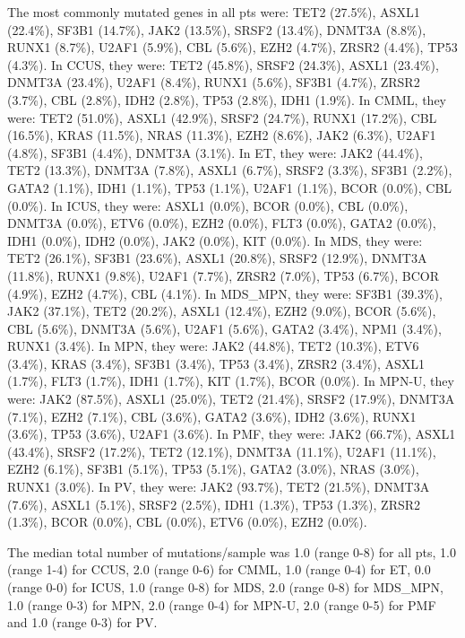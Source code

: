 The most commonly mutated genes in all pts were: TET2 (27.5\%), ASXL1 (22.4\%), SF3B1 (14.7\%), JAK2 (13.5\%), SRSF2 (13.4\%), DNMT3A (8.8\%), RUNX1 (8.7\%), U2AF1 (5.9\%), CBL (5.6\%), EZH2 (4.7\%), ZRSR2 (4.4\%), TP53 (4.3\%). In CCUS, they were: TET2 (45.8\%), SRSF2 (24.3\%), ASXL1 (23.4\%), DNMT3A (23.4\%), U2AF1 (8.4\%), RUNX1 (5.6\%), SF3B1 (4.7\%), ZRSR2 (3.7\%), CBL (2.8\%), IDH2 (2.8\%), TP53 (2.8\%), IDH1 (1.9\%). In CMML, they were: TET2 (51.0\%), ASXL1 (42.9\%), SRSF2 (24.7\%), RUNX1 (17.2\%), CBL (16.5\%), KRAS (11.5\%), NRAS (11.3\%), EZH2 (8.6\%), JAK2 (6.3\%), U2AF1 (4.8\%), SF3B1 (4.4\%), DNMT3A (3.1\%). In ET, they were: JAK2 (44.4\%), TET2 (13.3\%), DNMT3A (7.8\%), ASXL1 (6.7\%), SRSF2 (3.3\%), SF3B1 (2.2\%), GATA2 (1.1\%), IDH1 (1.1\%), TP53 (1.1\%), U2AF1 (1.1\%), BCOR (0.0\%), CBL (0.0\%). In ICUS, they were: ASXL1 (0.0\%), BCOR (0.0\%), CBL (0.0\%), DNMT3A (0.0\%), ETV6 (0.0\%), EZH2 (0.0\%), FLT3 (0.0\%), GATA2 (0.0\%), IDH1 (0.0\%), IDH2 (0.0\%), JAK2 (0.0\%), KIT (0.0\%). In MDS, they were: TET2 (26.1\%), SF3B1 (23.6\%), ASXL1 (20.8\%), SRSF2 (12.9\%), DNMT3A (11.8\%), RUNX1 (9.8\%), U2AF1 (7.7\%), ZRSR2 (7.0\%), TP53 (6.7\%), BCOR (4.9\%), EZH2 (4.7\%), CBL (4.1\%). In MDS_MPN, they were: SF3B1 (39.3\%), JAK2 (37.1\%), TET2 (20.2\%), ASXL1 (12.4\%), EZH2 (9.0\%), BCOR (5.6\%), CBL (5.6\%), DNMT3A (5.6\%), U2AF1 (5.6\%), GATA2 (3.4\%), NPM1 (3.4\%), RUNX1 (3.4\%). In MPN, they were: JAK2 (44.8\%), TET2 (10.3\%), ETV6 (3.4\%), KRAS (3.4\%), SF3B1 (3.4\%), TP53 (3.4\%), ZRSR2 (3.4\%), ASXL1 (1.7\%), FLT3 (1.7\%), IDH1 (1.7\%), KIT (1.7\%), BCOR (0.0\%). In MPN-U, they were: JAK2 (87.5\%), ASXL1 (25.0\%), TET2 (21.4\%), SRSF2 (17.9\%), DNMT3A (7.1\%), EZH2 (7.1\%), CBL (3.6\%), GATA2 (3.6\%), IDH2 (3.6\%), RUNX1 (3.6\%), TP53 (3.6\%), U2AF1 (3.6\%). In PMF, they were: JAK2 (66.7\%), ASXL1 (43.4\%), SRSF2 (17.2\%), TET2 (12.1\%), DNMT3A (11.1\%), U2AF1 (11.1\%), EZH2 (6.1\%), SF3B1 (5.1\%), TP53 (5.1\%), GATA2 (3.0\%), NRAS (3.0\%), RUNX1 (3.0\%). In PV, they were: JAK2 (93.7\%), TET2 (21.5\%), DNMT3A (7.6\%), ASXL1 (5.1\%), SRSF2 (2.5\%), IDH1 (1.3\%), TP53 (1.3\%), ZRSR2 (1.3\%), BCOR (0.0\%), CBL (0.0\%), ETV6 (0.0\%), EZH2 (0.0\%).

The median total number of mutations/sample was 1.0 (range 0-8) for all pts, 1.0 (range 1-4) for CCUS, 2.0 (range 0-6) for CMML, 1.0 (range 0-4) for ET, 0.0 (range 0-0) for ICUS, 1.0 (range 0-8) for MDS, 2.0 (range 0-8) for MDS_MPN, 1.0 (range 0-3) for MPN, 2.0 (range 0-4) for MPN-U, 2.0 (range 0-5) for PMF and 1.0 (range 0-3) for PV.


